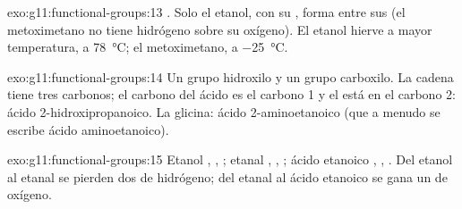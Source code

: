 \begin{solution}{exo:g11:functional-groups:13}
. Solo el etanol, con su , forma 
entre sus  (el metoximetano no tiene hidrógeno sobre su
oxígeno). El etanol hierve a mayor temperatura, a \qty{78}{\celsius}; el
metoximetano, a \qty{-25}{\celsius}.
\end{solution}

\begin{solution}{exo:g11:functional-groups:14}
Un grupo hidroxilo y un grupo carboxilo. La cadena tiene tres carbonos;
el carbono del ácido es el carbono 1 y el  está en el carbono 2:
ácido 2-hidroxipropanoico. La glicina: ácido 2-aminoetanoico (que a
menudo se escribe ácido aminoetanoico).
\end{solution}

\begin{solution}{exo:g11:functional-groups:15}
Etanol , , ; etanal ,
, ; ácido etanoico , , . Del etanol al etanal se pierden dos  de hidrógeno;
del etanal al ácido etanoico se gana un  de oxígeno.
\end{solution}

